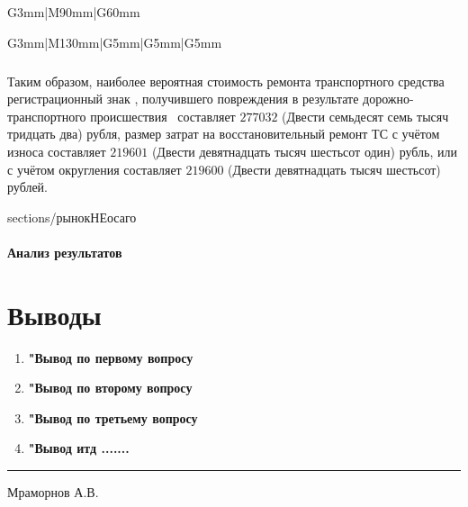 \begin{longtable}{G{3mm}|M{90mm}|G{60mm}}
\begin{longtable}{G{3mm}|M{130mm}|G{5mm}|G{5mm}|G{5mm}}
		
		\subparagraph{}Таким образом,  наиболее вероятная стоимость ремонта транспортного средства \tc\, регистрационный знак , получившего повреждения в результате дорожно-транспортного происшествия  \, составляет $277 032$ (Двести семьдесят семь тысяч тридцать два) рубля,  размер затрат на восстановительный ремонт ТС с учётом износа составляет  $ 219 601 $ (Двести девятнадцать тысяч шестьсот один) рубль, или с учётом округления составляет $ 219 600 $ (Двести девятнадцать тысяч шестьсот) рублей.
		
	 {sections/рынокНЕосаго}

%
\paragraph{Анализ результатов}


\section{Выводы}

\begin{enumerate}
	\item \textbf{"Вывод по первому вопросу}\\[3mm]
	\item \textbf{"Вывод по второму вопросу}\\[3mm]
	\item \textbf{"Вывод по третьему вопросу}\\[3mm]
	\item \textbf{"Вывод  итд .......}\\[3mm]
	
	\vspace{5mm}
	
\end{enumerate}
    
\vspace{10mm}
  \hfill    \rule{45mm}{0.1 mm}   {Мраморнов А.В.}\\
\vspace{7mm}
\relax

\vspace{15mm}


\end{longtable}
\end{longtable}
